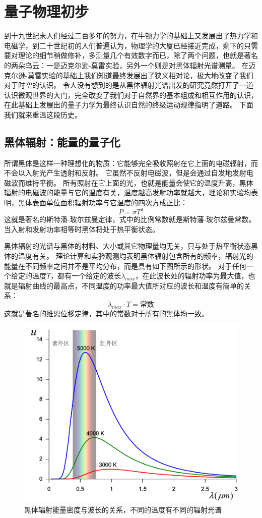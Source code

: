
\chapter{量子物理初步}
到十九世纪末人们经过二百多年的努力，在牛顿力学的基础上又发展出了热力学和电磁学，到二十世纪初的人们普遍认为，物理学的大厦已经接近完成，剩下的只需要对理论的细节稍做修补，多测量几个有效数字而已，除了两个问题，也就是著名的两朵乌云：一是迈克尔逊-莫雷实验，另外一个则是对黑体辐射光谱测量。
在迈克尔逊-莫雷实验的基础上我们知道最终发展出了狭义相对论，极大地改变了我们对于时空的认识。
令人没有想到的是从黑体辐射光谱出发的研究竟然打开了一道认识微观世界的大门，完全改变了我们对于自然界的基本组成和相互作用的认识，在此基础上发展出的量子力学为最终认识自然的终级运动规律指明了道路。
下面我们就来重温这段历史。

\section{黑体辐射：能量的量子化}
所谓黑体是这样一种理想化的物质：它能够完全吸收照射在它上面的电磁辐射，而不会以入射光产生透射和反射。
它虽然不反射电磁波，但是会通过自发地发射电磁波而维持平衡。
所有照射在它上面的光，也就是能量会使它的温度升高，黑体辐射的电磁波的能量与它的温度有关，温度越高发射功率就越大，理论和实验均表明，黑体表面单位面积辐射功率与它温度的四次方成正比：
\begin{equation}
P=\sigma T^4
\end{equation}
这就是著名的斯特潘-玻尔兹曼定律，式中的比例常数就是斯特藩-玻尔兹曼常数。
当入射和发射功率相等时黑体将处于热平衡状态。


黑体辐射的光谱与黑体的材料、大小或其它物理量均无关，只与处于热平衡状态黑体的温度有关。
理论计算和实验观测均表明黑体辐射包含所有的频率，辐射光的能量在不同频率之间并不是平均分布，而是具有如下图所示的形状。
对于任何一个给定的温度$T$，都有一个给定的波长$\lambda_{max}$，在此波长处的辐射功率为最大值，也就是辐射曲线的最高点，不同温度的功率最大值所对应的波长和温度有简单的关系：
\begin{equation}
\lambda_{max}\cdot T = \text{常数}
\end{equation}
这就是著名的维恩位移定律，其中的常数对于所有的黑体均一致。
\begin{figure}
\centering
\includegraphics[width=0.6\linewidth]{images/particle-5}
\caption{黑体辐射能量密度与波长的关系，不同的温度有不同的辐射光谱}
\label{fig:particle-5}
\end{figure}

